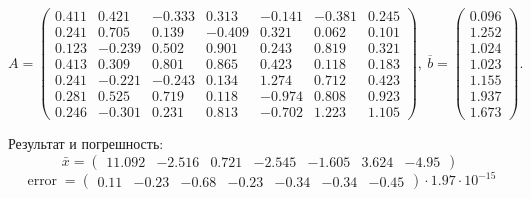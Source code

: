 
        \[
            A = \begin{pmatrix}
                0.411 & 0.421 & -0.333 & 0.313 & -0.141 & -0.381 & 0.245 \\
                0.241 & 0.705 & 0.139 & -0.409 & 0.321 & 0.062 & 0.101 \\
                0.123 & -0.239 & 0.502 & 0.901 & 0.243 & 0.819 & 0.321 \\
                0.413 & 0.309 & 0.801 & 0.865 & 0.423 & 0.118 & 0.183 \\
                0.241 & -0.221 & -0.243 & 0.134 & 1.274 & 0.712 & 0.423 \\
                0.281 & 0.525 & 0.719 & 0.118 & -0.974 & 0.808 & 0.923 \\
                0.246 & -0.301 & 0.231 & 0.813 & -0.702 & 1.223 & 1.105
            \end{pmatrix}
        , ~ \overline{b} = \begin{pmatrix}
                0.096 \\
                1.252 \\
                1.024 \\
                1.023 \\
                1.155 \\
                1.937 \\
                1.673
            \end{pmatrix}
        .\] 

        Результат и погрешность:
        \[ \displaystyle \bar x = \begin{pmatrix}
            11.092 & -2.516 & 0.721 & -2.545 & -1.605 & 3.624 & -4.95
        \end{pmatrix} \] 
        \[ \displaystyle \operatorname{error} = \begin{pmatrix}
            0.11 & -0.23 & -0.68 & -0.23 & -0.34 & -0.34 & -0.45
        \end{pmatrix} \cdot 1.97 \cdot 10^{-15} \]

